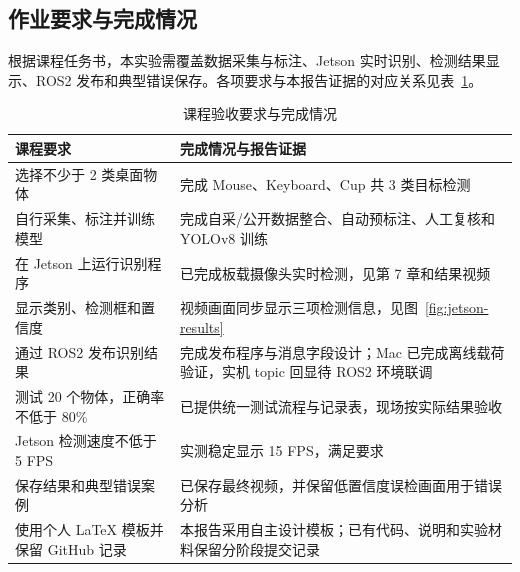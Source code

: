 \documentclass[UTF8,fontset=none,a4paper,11pt]{ctexart}
\begin{document}
\subsection{作业要求与完成情况}
根据课程任务书，本实验需覆盖数据采集与标注、Jetson 实时识别、检测结果显示、ROS2 发布和典型错误保存。各项要求与本报告证据的对应关系见表~\ref{tab:requirements}。
\begin{table}[htbp]\centering\caption{课程验收要求与完成情况}\label{tab:requirements}
{\renewcommand{\arraystretch}{1.28}\begin{tabular}{>{\raggedright\arraybackslash}m{4.6cm}>{\raggedright\arraybackslash}m{9.4cm}}\toprule
\textbf{课程要求} & \textbf{完成情况与报告证据}\\\midrule
选择不少于 2 类桌面物体 & 完成 Mouse、Keyboard、Cup 共 3 类目标检测\\
自行采集、标注并训练模型 & 完成自采/公开数据整合、自动预标注、人工复核和 YOLOv8 训练\\
在 Jetson 上运行识别程序 & 已完成板载摄像头实时检测，见第 7 章和结果视频\\
显示类别、检测框和置信度 & 视频画面同步显示三项检测信息，见图~\ref{fig:jetson-results}\\
通过 ROS2 发布识别结果 & 完成发布程序与消息字段设计；Mac 已完成离线载荷验证，实机 topic 回显待 ROS2 环境联调\\
测试 20 个物体，正确率不低于 80\% & 已提供统一测试流程与记录表，现场按实际结果验收\\
Jetson 检测速度不低于 5 FPS & 实测稳定显示 15 FPS，满足要求\\
保存结果和典型错误案例 & 已保存最终视频，并保留低置信度误检画面用于错误分析\\
使用个人 LaTeX 模板并保留 GitHub 记录 & 本报告采用自主设计模板；已有代码、说明和实验材料保留分阶段提交记录\\\bottomrule
\end{tabular}}
\end{table}
\end{document}
